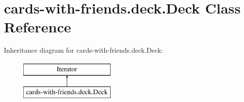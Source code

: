 \hypertarget{classcards-with-friends_1_1deck_1_1_deck}{\section{cards-\/with-\/friends.deck.\-Deck Class Reference}
\label{classcards-with-friends_1_1deck_1_1_deck}
}
Inheritance diagram for cards-\/with-\/friends.deck.\-Deck\-:\begin{figure}[H]
\begin{center}
\leavevmode
\includegraphics[height=2.000000cm]{classcards-with-friends_1_1deck_1_1_deck}
\end{center}
\end{figure}
